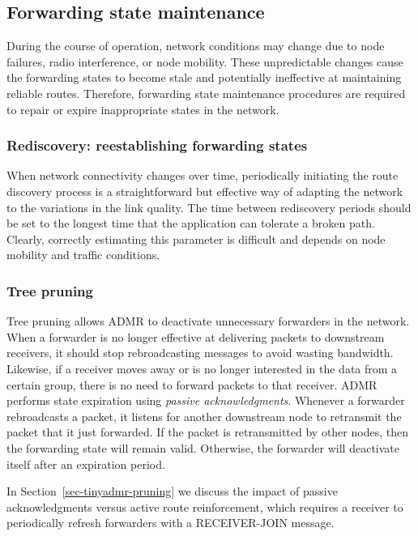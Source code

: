 \subsection{Forwarding state maintenance}

During the course of operation, network conditions may change due to
node failures, radio interference, or node mobility.
These unpredictable changes cause the forwarding states 
to become stale and potentially ineffective at maintaining
reliable routes. Therefore, forwarding state maintenance procedures 
are required to repair or expire inappropriate states in the network. 

\subsubsection{Rediscovery: reestablishing forwarding states}
When network connectivity changes over time, periodically initiating 
the route discovery process is a straightforward but effective way of 
adapting the network to the variations in the link quality. 
The time between rediscovery periods should be set to the longest 
time that the application can tolerate a broken path. Clearly, 
correctly estimating this parameter is difficult and depends on
node mobility and traffic conditions.

\subsubsection{Tree pruning}
Tree pruning allows ADMR to deactivate unnecessary forwarders 
in the network. When a forwarder is no longer effective at
delivering packets to downstream receivers, it should stop
rebroadcasting messages to avoid wasting bandwidth.
Likewise, if a receiver moves away or is no longer interested in 
the data from a certain group, there is no need to forward packets 
to that receiver. ADMR performs state 
expiration using {\em passive acknowledgments}. Whenever a forwarder 
rebroadcasts a packet, it listens for another downstream node to 
retransmit the packet that it just forwarded. 
If the packet is retransmitted by other nodes, then the forwarding 
state will remain valid. Otherwise, the forwarder will deactivate itself
after an expiration period. 

In Section~\ref{sec-tinyadmr-pruning} we discuss the impact of passive
acknowledgments versus active route reinforcement, which requires
a receiver to periodically refresh forwarders with a RECEIVER-JOIN
message.

